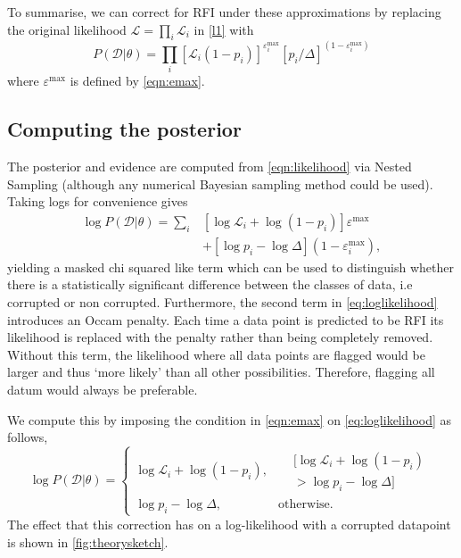 \documentclass[fleqn,usenatbib]{mnras}
\begin{document}
To summarise, we can correct for RFI under these approximations by replacing the original likelihood $\mathcal{L} = \prod_i\mathcal{L}_i$ in \cref{l1} with 
\begin{equation}
    P(\mathcal{D}|\theta) = \prod_i\left[\mathcal{L}_{i}(1-p_i)\right]^{\varepsilon^{\mathrm{max}}_{i}} \left[p_i/\Delta\right]^{(1-\varepsilon^\mathrm{max}_i)}
    \label{eqn:likelihood}
\end{equation}
where $\varepsilon^{\mathrm{max}}$ is defined by \cref{eqn:emax}.
\subsection{Computing the posterior}
The posterior and evidence are computed from \cref{eqn:likelihood} via Nested Sampling (although any numerical Bayesian sampling method could be used). Taking logs for convenience gives
\begin{equation}
    \begin{aligned}
        \log{P(\mathcal{D}|\theta)} = \sum_{i} &[\log{\mathcal{L}_i}+\log({1-p_i})]\varepsilon^{\mathrm{max}}\\ 
        &+ [\log{p}_i - \log{\Delta}](1 - \varepsilon^\mathrm{max}_i), \label{eq:loglikelihood}
    \end{aligned}
\end{equation}
yielding a masked chi squared like term which can be used to distinguish whether there is a statistically significant difference between the classes of data, i.e corrupted or non corrupted. Furthermore, the second term in \cref{eq:loglikelihood} introduces an Occam penalty. Each time a data point is predicted to be RFI its likelihood is replaced with the penalty rather than being completely removed. Without this term, the likelihood where all data points are flagged would be larger and thus `more likely' than all other possibilities. Therefore, flagging all datum would always be preferable.

We compute this by imposing the condition in \cref{eqn:emax} on \cref{eq:loglikelihood} as follows, \begin{equation}
    \log{P(\mathcal{D}|\theta)} =  
    \begin{cases}
        \log \mathcal{L}_i + \log (1-p_i), &
    \begin{aligned}
        &[\log{\mathcal{L}_i} + \log({1-p_i}) \\
        &> \log p_i - \log \Delta]
    \end{aligned}\\ 
        \log p_i - \log \Delta, & \text{otherwise}.
    \end{cases}
    \label{eqn:loglcompute}
\end{equation}
The effect that this correction has on a log-likelihood with a corrupted datapoint is shown in \cref{fig:theorysketch}.
\end{document}
